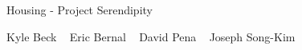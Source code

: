 Housing -\/ Project Serendipity

Kyle Beck ~\newline
 Eric Bernal ~\newline
 David Pena ~\newline
 Joseph Song-\/\+Kim ~\newline
 
